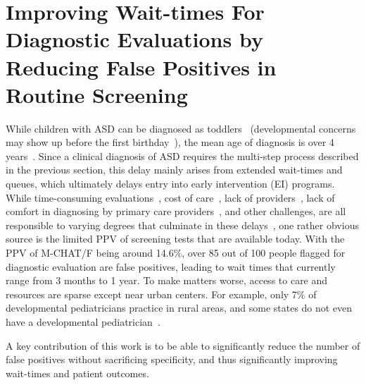 \documentclass[onecolumn,,10pt]{IEEEtran}
\begin{document}
\section{Improving Wait-times For  Diagnostic Evaluations by Reducing False Positives  in Routine Screening}\label{sec:waittime}
While children with ASD  can be diagnosed as toddlers~\cite{lord2006autism,kleinman2008diagnostic} (developmental concerns may show up before the first birthday~\cite{bolton2012autism,kozlowski2011parents}), the mean  age of
diagnosis is over 4 years~\cite{baio2014prevalence}. 
%
%
Since a clinical diagnosis of ASD requires the multi-step process described in the previous section, this delay mainly arises from extended   wait-times and queues, which ultimately 
delays entry into early intervention (EI) programs. 
While   time-consuming evaluations~\cite{kalb2012determinants}, cost of care~\cite{bisgaier2011access},  lack of providers~\cite{fenikile2015barriers}, lack of comfort in diagnosing
by primary care providers~\cite{fenikile2015barriers},  and other challenges, are all responsible to varying degrees that culminate in these delays~\cite{gordon2016whittling}, one rather obvious source is the limited PPV of screening tests that are available today. With the PPV of M-CHAT/F being around 14.6\%, over 85 out of 100 people flagged for diagnostic evaluation are false positives, leading to wait times that currently range from 3 months to 1 year. To make matters worse, access to care and resources are sparse  except near urban  centers. For example, only 7\% of developmental pediatricians practice in rural areas, and some states do not even have a developmental pediatrician~\cite{gordon2016whittling,althouse2006pediatric}.

A key contribution of this work is to be able to significantly reduce the number of false positives without sacrificing specificity, and thus significantly  improving wait-times and  patient outcomes.
  
\end{document}
